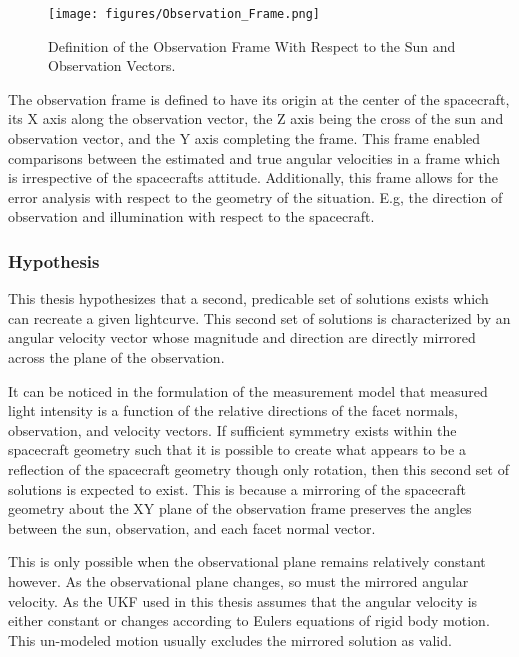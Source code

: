 \begin{figure}[ht]
	\begin{center}
		\texttt{[image: figures/Observation\_Frame.png]}
		\caption{Definition of the Observation Frame With Respect to the Sun and Observation Vectors.}
	\end{center}
\end{figure}

The observation frame is defined to have its origin at the center of the spacecraft, its X axis along the observation vector, the Z axis being the cross of the sun and observation vector, and the Y axis completing the frame. This frame enabled comparisons between the estimated and true angular velocities in a frame which is irrespective of the spacecrafts attitude. Additionally, this frame allows for the error analysis with respect to the geometry of the situation. E.g, the direction of observation and illumination with respect to the spacecraft.

\subsubsection{Hypothesis}

This thesis hypothesizes that a second, predicable set of solutions exists which can recreate a given lightcurve. This second set of solutions is characterized by an angular velocity vector whose magnitude and direction are directly mirrored across the plane of the observation.

It can be noticed in the formulation of the measurement model that measured light intensity is a function of the relative directions of the facet normals, observation, and velocity vectors. If sufficient symmetry exists within the spacecraft geometry such that it is possible to create what appears to be a reflection of the spacecraft geometry though only rotation, then this second set of solutions is expected to exist. This is because a mirroring of the spacecraft geometry about the XY plane of the observation frame preserves the angles between the sun, observation, and each facet normal vector.

This is only possible when the observational plane remains relatively constant however. As the observational plane changes, so must the mirrored angular velocity. As the UKF used in this thesis assumes that the angular velocity is either constant or changes according to Eulers equations of rigid body motion. This un-modeled motion usually excludes the mirrored solution as valid.


